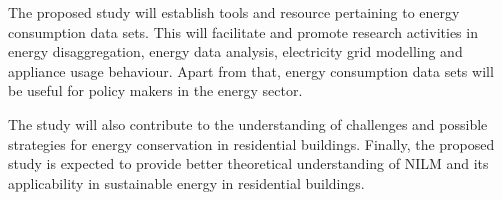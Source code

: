 The proposed study will establish tools and resource pertaining to energy consumption data sets. This will facilitate and promote research activities in energy disaggregation, energy data analysis, electricity grid modelling and appliance usage behaviour. Apart from that, energy consumption data sets  will be useful for policy makers in the energy sector.

The study will also contribute to the  understanding of challenges and possible strategies for energy conservation in residential buildings. Finally, the proposed study is expected to provide better theoretical understanding of NILM and its applicability in sustainable energy in residential buildings. 